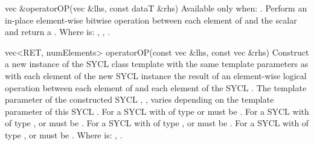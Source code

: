  \addRow
  {vec \&operatorOP(vec \&lhs, const dataT \&rhs)}
  {
    Available only when: .
    \newline
    Perform an in-place element-wise  bitwise operation between each element of   and the  scalar and return a  .
    \newline \newline
    Where  is: \codeinline{\&=}, \codeinline{\|=}, \codeinline{\^=}. 
  }

  \addRow
  {vec<RET, numElements> operatorOP(const vec \&lhs, const vec \&rhs)}
  {
    Construct a new instance of the SYCL  class template with the same template parameters as   with each element of the new SYCL  instance the result of an element-wise  logical operation between each element of   and each element of the  SYCL .
    \newline \newline
    The  template parameter of the constructed SYCL , , varies depending on the  template parameter of this SYCL . For a SYCL  with  of type  or   must be . For a SYCL  with  of type ,  or   must be . For a SYCL  with  of type ,  or   must be . For a SYCL  with  of type ,  or   must be .
    \newline \newline
    Where  is: \codeinline{\&\&}, \codeinline{\|\|}.
  }

